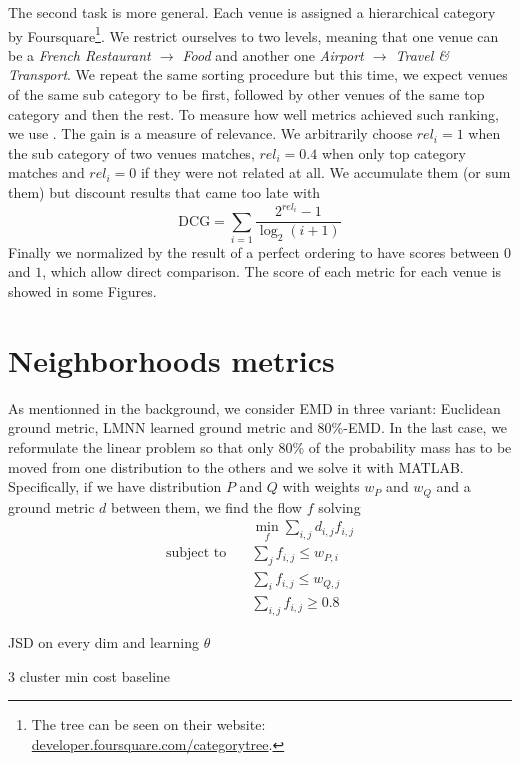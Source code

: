 The second task is more general. Each venue is assigned a hierarchical category
by Foursquare\footnote{The tree can be seen on their website:
\href{https://developer.foursquare.com/categorytree}{%
\url{developer.foursquare.com/categorytree}}.}. We restrict ourselves
to two levels, meaning that one venue can be a \emph{French Restaurant
$\rightarrow$ Food} and another one \emph{Airport $\rightarrow$ Travel
\& Transport}. We repeat the same sorting procedure but this time, we expect
venues of the same sub category to be first, followed by other venues of the
same top category and then the rest. To measure how well metrics achieved such
ranking, we use 
\autocite{IREvaluation07}. The gain is a measure of relevance. We arbitrarily
choose $rel_i=1$ when the sub category of two venues matches, $rel_i=0.4$ when
only top category matches and $rel_i=0$ if they were not related at all. We
accumulate them (or sum them) but discount results that came too late with \[
\mathrm{DCG} = \sum_{i=1} \frac{ 2^{rel_{i}} - 1 }{ \log_{2}(i+1)} \]
Finally we normalized by the result of a perfect ordering to have scores
between $0$ and $1$, which allow direct comparison. The score of each metric
for each venue is showed in some Figures.

\section{Neighborhoods metrics}

As mentionned in the background, we consider EMD in three variant: Euclidean
ground metric, LMNN learned ground metric and 80\%-EMD. In the last case, we
reformulate the linear problem so that only 80\% of the probability mass has
to be moved from one distribution to the others and we solve it with MATLAB.
Specifically, if we have distribution $P$ and $Q$ with weights $w_P$ and $w_Q$
and a ground metric $d$ between them, we find the flow $f$ solving
\begin{align*}
	&\quad \underset{f}{\min} \sum_{i,j} d_{i,j} f_{i,j} \\
	\text{subject to} &\quad \sum_j f_{i,j} \leq w_{P,i} \\
	&\quad \sum_i f_{i,j} \leq w_{Q,j} \\
	&\quad \sum_{i,j} f_{i,j} \geq 0.8 
\end{align*}

JSD on every dim and learning $\theta$

3 cluster min cost baseline




